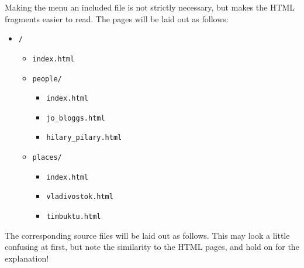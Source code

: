 \documentclass[english]{scrartcl}
\begin{document}
Making the menu an included file is not strictly necessary, but makes the HTML fragments easier to read. The pages will be laid out as follows:

\begin{itemize}
\item \verb|/|
  \begin{itemize}
  \item \verb|index.html|
  \item \verb|people/|
    \begin{itemize}
    \item \verb|index.html|
    \item \verb|jo_bloggs.html|
    \item \verb|hilary_pilary.html|
    \end{itemize}
  \item \verb|places/|
    \begin{itemize}
    \item \verb|index.html|
    \item \verb|vladivostok.html|
    \item \verb|timbuktu.html|
    \end{itemize}
  \end{itemize}
\end{itemize}

The corresponding source files will be laid out as follows. This may look a little confusing at first, but note the similarity to the HTML pages, and hold on for the explanation!
\end{document}
